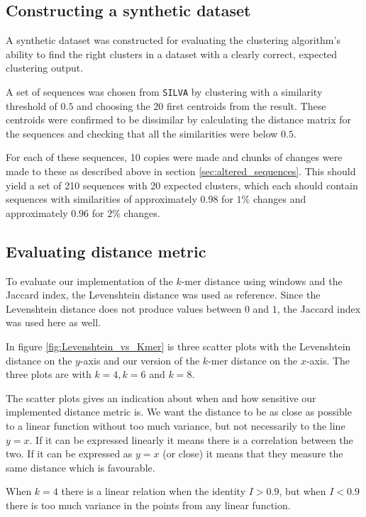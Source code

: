 \subsection{Constructing a synthetic dataset}

A synthetic dataset was constructed for evaluating the clustering algorithm's
ability to find the right clusters in a dataset with a clearly correct,
expected clustering output.

A set of sequences was chosen from \texttt{SILVA} by clustering with a
similarity threshold of $0.5$ and choosing the 20 first centroids from the
result. These centroids were confirmed to be dissimilar by calculating the
distance matrix for the sequences and checking that all the similarities were
below $0.5$.

For each of these sequences, 10 copies were made and chunks of changes were
made to these as described above in section \ref{sec:altered_sequences}. This
should yield a set of 210 sequences with 20 expected clusters, which each
should contain sequences with similarities of approximately $0.98$ for $1\%$
changes and approximately $0.96$ for $2\%$ changes.


\subsection{Evaluating distance metric}

To evaluate our implementation of the $k$-mer distance using windows and the
Jaccard index, the Levenshtein distance was used as reference. Since the
Levenshtein distance does not produce values between $0$ and $1$, the Jaccard
index was used here as well.

In figure \ref{fig:Levenshtein_vs_Kmer} is three scatter plots with the
Levenshtein distance on the $y$-axis and our version of the $k$-mer distance on
the $x$-axis. The three plots are with $k=4, k=6$ and $k=8$.

The scatter plots gives an indication about when and how sensitive our
implemented distance metric is. We want the distance to be as close as possible
to a linear function without too much variance, but not necessarily to the line
$y=x$. If it can be expressed linearly it means there is a correlation between
the two. If it can be expressed as $y=x$ (or close) it means that they measure
the same distance which is favourable.

When $k=4$ there is a linear relation when the identity $I>0.9$, but when
$I<0.9$ there is too much variance in the points from any linear function.

